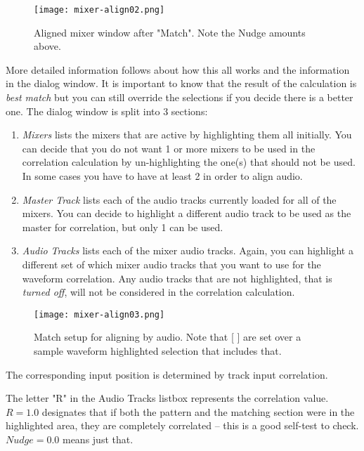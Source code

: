 \begin{figure}[htpb]
    \centering
    \texttt{[image: mixer-align02.png]}
    \caption{Aligned mixer window after "Match". Note the Nudge amounts above.}
    \label{fig:mixer-align02}
\end{figure}

More detailed information follows about how this all works and the information in the dialog window.  It is important to know that the result of the calculation is \textit{best match} but you can still override the selections if you decide there is a better one.  The dialog window is split into 3 sections:

\begin{enumerate}
    \item \textit{Mixers} lists the mixers that are active by highlighting them all initially. You can decide that you do
    not want 1 or more mixers to be used in the correlation calculation by un-highlighting the one(s) that should not be used. In some cases you have to have at least 2 in order to align audio.
    \item \textit{Master Track} lists each of the audio tracks currently loaded for all of the mixers. You can decide to highlight a different audio track to be used as the master for correlation, but only 1 can be used.
    \item \textit{Audio Tracks} lists each of the mixer audio tracks.  Again, you can highlight a different set of which
    mixer audio tracks that you want to use for the waveform correlation.  Any audio tracks that are not
    highlighted, that is \textit{turned off}, will not be considered in the correlation calculation.
\end{enumerate}

\begin{figure}[htpb]
    \centering
    \texttt{[image: mixer-align03.png]}
    \caption{Match setup for aligning by audio.  Note that [ ] are set over a sample waveform highlighted selection that includes that.}
    \label{fig:mixer-align03}
\end{figure}

The corresponding input position is determined by track input correlation.

The letter "R" in the Audio Tracks listbox represents the correlation value.  $R=1.0$ designates that if both the pattern and the matching section were in the highlighted area, they are completely correlated -- this is a good self-test to check.
$Nudge=0.0$ means just that.

